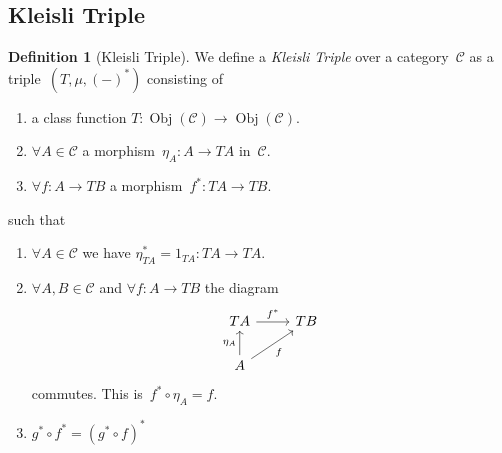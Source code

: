\documentclass[a4paper]{article}
\theoremstyle{plain}
\theoremstyle{definition}
\newtheorem{definition}[theorem]{Definition}
\DeclareMathOperator{\Obj}{Obj}
\newcommand{\cat}[1]{\mathcal{#1}}
\begin{document}
\subsection{Kleisli Triple}
\begin{definition}[Kleisli Triple]
    We define a \emph{Kleisli Triple} over a category~\(\cat{C}\)
    as a triple~\((T, \mu, (-)^{\ast})\) consisting of
    \begin{enumerate}
        \item a class function
            \(T:\Obj(\cat{C})\longrightarrow\Obj(\cat{C})\).
        \item \(\forall A\in\cat{C}\)
            a morphism~\(\eta_{A}:A\longrightarrow TA\)
            in~\(\cat{C}\).
        \item \(\forall f:A\longrightarrow TB\)
            a morphism~\(f^{\ast}:TA\longrightarrow TB\).
    \end{enumerate}
    such that
    \begin{enumerate}
        \item \(\forall A\in\cat{C}\) we have
            \(\eta^{\ast}_{TA} = 1_{TA}:TA\longrightarrow TA\).
        \item \(\forall A,B\in\cat{C}\)
            and \(\forall f:A\longrightarrow TB\)
            the diagram
            \[\begin{tikzcd}
                TA \arrow[r, "f^{\ast}"] & TB \\
                A \arrow[u, "\eta_{A}"] \arrow[ur, "f", swap] &
            \end{tikzcd}\]
            commutes. This is~\(f^{\ast}\circ\eta_{A} = f\).
        \item \(g^{\ast}\circ f^{\ast} = (g^{\ast}\circ f)^{\ast}\)
    \end{enumerate}
\end{definition}
\end{document}
